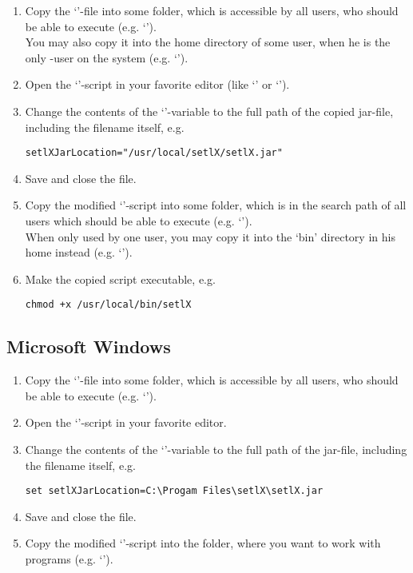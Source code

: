 \begin{enumerate}
	\item Copy the `'-file into some folder, which is accessible by all users, who should be able to execute \setlX{} (e.g. `').\\
	You may also copy it into the home directory of some user, when he is the only \setlX-user on the system (e.g. `').
	\item Open the `'-script in your favorite editor (like `' or `').
	\item Change the contents of the `'-variable to the full path of the copied jar-file, including the filename itself, e.g.
\begin{lstlisting}[frame=none,numbers=none]
setlXJarLocation="/usr/local/setlX/setlX.jar"
\end{lstlisting}
	\item Save and close the file.
	\item Copy the modified `'-script into some folder, which is in the search path of all users which should be able to execute \setlX{} (e.g. `').\\
	When only used by one user, you may copy it into the `bin' directory in his home instead (e.g. `').
	\item Make the copied script executable, e.g.
\begin{lstlisting}[frame=none,numbers=none]
chmod +x /usr/local/bin/setlX
\end{lstlisting}
\end{enumerate}

\subsection{Microsoft Windows}

\begin{enumerate}
	\item Copy the `'-file into some folder, which is accessible by all users, who should be able to execute \setlX{} (e.g. `').
	\item Open the `'-script in your favorite editor.
	\item Change the contents of the `'-variable to the full path of the jar-file, including the filename itself, e.g.
\begin{lstlisting}[frame=none,numbers=none]
set setlXJarLocation=C:\Progam Files\setlX\setlX.jar
\end{lstlisting}
	\item Save and close the file.
	\item Copy the modified `'-script into the folder, where you want to work with \setlX{} programs (e.g. `').
\end{enumerate}

